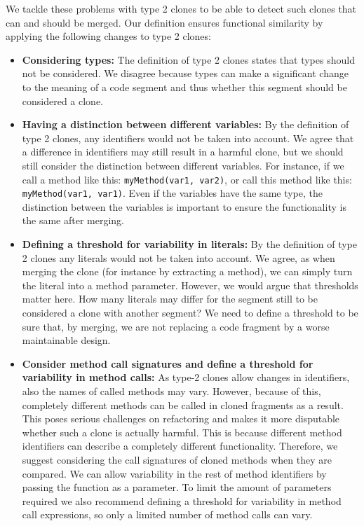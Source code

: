 \documentclass[a4paper]{article}
\begin{document}
We tackle these problems with type 2 clones to be able to detect such clones that can and should be merged. Our definition ensures functional similarity by applying the following changes to type 2 clones:

\begin{itemize}
  \item \textbf{Considering types:} The definition of type 2 clones states that types should not be considered. We disagree because types can make a significant change to the meaning of a code segment and thus whether this segment should be considered a clone.
  \item \textbf{Having a distinction between different variables:} By the definition of type 2 clones, any identifiers would not be taken into account. We agree that a difference in identifiers may still result in a harmful clone, but we should still consider the distinction between different variables. For instance, if we call a method like this: \texttt{myMethod(var1, var2)}, or call this method like this: \texttt{myMethod(var1, var1)}. Even if the variables have the same type, the distinction between the variables is important to ensure the functionality is the same after merging.
  \item \textbf{Defining a threshold for variability in literals:} By the definition of type 2 clones any literals would not be taken into account. We agree, as when merging the clone (for instance by extracting a method), we can simply turn the literal into a method parameter. However, we would argue that thresholds matter here. How many literals may differ for the segment still to be considered a clone with another segment? We need to define a threshold to be sure that, by merging, we are not replacing a code fragment by a worse maintainable design.
  \item \textbf{Consider method call signatures and define a threshold for variability in method calls:} As type-2 clones allow changes in identifiers, also the names of called methods may vary. However, because of this, completely different methods can be called in cloned fragments as a result. This poses serious challenges on refactoring and makes it more disputable whether such a clone is actually harmful. This is because different method identifiers can describe a completely different functionality. Therefore, we suggest considering the call signatures of cloned methods when they are compared. We can allow variability in the rest of method identifiers by passing the function as a parameter. To limit the amount of parameters required we also recommend defining a threshold for variability in method call expressions, so only a limited number of method calls can vary.
\end{itemize}
\end{document}
